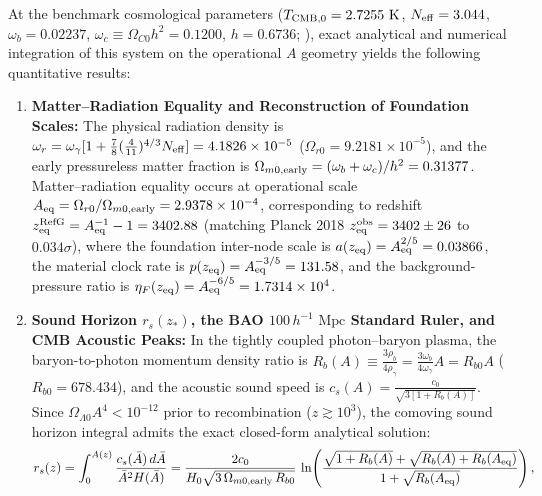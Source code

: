 \documentclass[11pt,a4paper]{article}
\begin{document}
At the benchmark cosmological parameters ($T_{\rm CMB,0} = 2.7255\text{ K}$, $N_{\rm eff} = 3.044$, $\omega_b = 0.02237$, $\omega_c \equiv \Omega_{C0}h^2 = 0.1200$, $h = 0.6736$; \citealt{planck2020}), exact analytical and numerical integration of this system on the operational $A$ geometry yields the following quantitative results:
\begin{enumerate}[label=\arabic*.]
\item \textbf{Matter--Radiation Equality and Reconstruction of Foundation Scales:} The physical radiation density is $\omega_r = \omega_\gamma[1 + \frac{7}{8}(\frac{4}{11})^{4/3}N_{\rm eff}] = 4.1826\times 10^{-5}$ ($\Omega_{r0} = 9.2181\times 10^{-5}$), and the early pressureless matter fraction is $\Omega_{m0,\rm early} = (\omega_b + \omega_c)/h^2 = 0.31377$. Matter--radiation equality occurs at operational scale $A_{\rm eq} = \Omega_{r0}/\Omega_{m0,\rm early} = 2.9378\times 10^{-4}$, corresponding to redshift $z_{\rm eq}^{\rm RefG} = A_{\rm eq}^{-1} - 1 = 3402.88$ (matching Planck 2018 $z_{\rm eq}^{\rm obs} = 3402 \pm 26$ to $0.034\sigma$), where the foundation inter-node scale is $a(z_{\rm eq}) = A_{\rm eq}^{2/5} = 0.03866$, the material clock rate is $p(z_{\rm eq}) = A_{\rm eq}^{-3/5} = 131.58$, and the background-pressure ratio is $\eta_F(z_{\rm eq}) = A_{\rm eq}^{-6/5} = 1.7314\times 10^4$.
\item \textbf{Sound Horizon $r_s(z_*)$, the BAO $100\,h^{-1}\text{ Mpc}$ Standard Ruler, and CMB Acoustic Peaks:} In the tightly coupled photon--baryon plasma, the baryon-to-photon momentum density ratio is $R_b(A) \equiv \frac{3\rho_b}{4\rho_\gamma} = \frac{3\omega_b}{4\omega_\gamma}A = R_{b0}A$ ($R_{b0} = 678.434$), and the acoustic sound speed is $c_s(A) = \frac{c_0}{\sqrt{3[1 + R_b(A)]}}$. Since $\Omega_{\Lambda 0}A^4 < 10^{-12}$ prior to recombination ($z \gtrsim 10^3$), the comoving sound horizon integral admits the exact closed-form analytical solution:
\begin{equation}
r_s(z) = \int_0^{A(z)} \frac{c_s(\bar{A})\,d\bar{A}}{\bar{A}^2 H(\bar{A})}
= \frac{2 c_0}{H_0\sqrt{3\,\Omega_{m0,\rm early}\,R_{b0}}}\,
\ln\!\left(\frac{\sqrt{1 + R_b(A)} + \sqrt{R_b(A) + R_b(A_{\rm eq})}}{1 + \sqrt{R_b(A_{\rm eq})}}\right),
\end{equation}

\end{enumerate}
\end{document}
